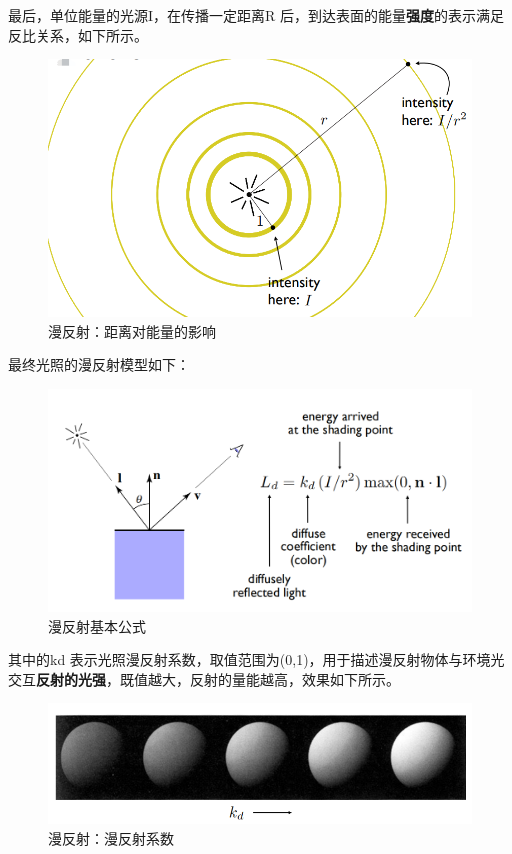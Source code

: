 \documentclass[UTF8,a4paper,12pt]{ctexbook}
\begin{document}
				最后，单位能量的光源I，在传播一定距离R 后，到达表面的能量\textbf{强度}的表示满足反比关系，如下所示。
				
				\begin{figure}[H]
					\centering
					\includegraphics[width=.9\linewidth]{DiffuseModel03}
					\caption{漫反射：距离对能量的影响}
				\end{figure}				
								
				最终光照的漫反射模型如下：
				
				\begin{figure}[H]
					\includegraphics[width=\linewidth]{LightBasic}
					\caption{漫反射基本公式}
				\end{figure}
				
				其中的kd 表示光照漫反射系数，取值范围为(0,1)，用于描述漫反射物体与环境光交互\textbf{反射的光强}，既值越大，反射的量能越高，效果如下所示。
				\begin{figure}[H]
					\centering
					\includegraphics[width=.9\linewidth]{DiffuseModel04}
					\caption{漫反射：漫反射系数}
				\end{figure}				
			
\end{document}
